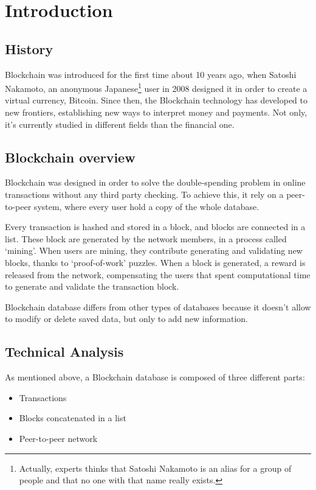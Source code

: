 \section{Introduction}

\subsection{History}
Blockchain was introduced for the first time about 10 years ago, when Satoshi
Nakamoto, an anonymous Japanese\footnote{Actually, experts thinks that Satoshi
Nakamoto is an alias for a group of people and that no one with that name
really exists.} user in 2008 designed it in order to create a virtual currency,
Bitcoin. Since then, the Blockchain technology has developed to new frontiers,
establishing new ways to interpret money and payments. Not only, it's currently
studied in different fields than the financial one.

\subsection{Blockchain overview}
Blockchain was designed in order to solve the double-spending problem in
online transactions without any third party checking\cite{nakamoto08}. To
achieve this, it rely on a peer-to-peer system, where every user hold a copy of
the whole database.

Every transaction is hashed and stored in a block, and blocks are connected in
a list. These block are generated by the network members, in a process called
`mining'. When users are mining, they contribute generating and validating new
blocks, thanks to `proof-of-work' puzzles. When a block is generated, a
reward is released from the network, compensating the users that spent
computational time to generate and validate the transaction block.

Blockchain database differs from other types of databases because it doesn't
allow to modify or delete saved data, but only to add new information.

\subsection{Technical Analysis}

As mentioned above, a Blockchain database is composed of three different
parts\cite{sok15}:
\begin{itemize}
 \item Transactions
 \item Blocks concatenated in a list
 \item Peer-to-peer network
\end{itemize}

